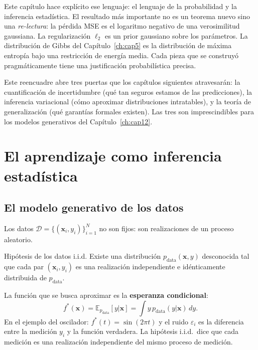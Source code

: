 Este capítulo hace explícito ese lenguaje: el lenguaje de la probabilidad
y la inferencia estadística. El resultado más importante no es un teorema
nuevo sino una \emph{re-lectura}: la pérdida MSE es el logaritmo negativo
de una verosimilitud gaussiana. La regularización $\ell_2$ es un prior
gaussiano sobre los parámetros. La distribución de Gibbs del
Capítulo~\ref{ch:cap5} es la distribución de máxima entropía bajo una
restricción de energía media. Cada pieza que se construyó pragmáticamente
tiene una justificación probabilística precisa.

Este reencuadre abre tres puertas que los capítulos siguientes atravesarán:
la cuantificación de incertidumbre (qué tan seguros estamos de las
predicciones), la inferencia variacional (cómo aproximar distribuciones
intratables), y la teoría de generalización (qué garantías formales
existen). Las tres son imprescindibles para los modelos generativos del
Capítulo~\ref{ch:cap12}.

\section{El aprendizaje como inferencia estadística}
\label{sec:aprendizaje_inferencia}


\subsection{El modelo generativo de los datos}
\label{subsec:modelo_generativo}

Los datos $\mathcal{D} = \{(\bm{x}_i, y_i)\}_{i=1}^N$ no son fijos:
son realizaciones de un proceso aleatorio.

\begin{definicion}{Hipótesis de los datos i.i.d.}
\label{hip:iid}
Existe una distribución $p_{\text{data}}(\bm{x},y)$ desconocida tal que
cada par $(\bm{x}_i, y_i)$ es una realización independiente e
idénticamente distribuida de $p_{\text{data}}$.
\end{definicion}

La función que se busca aproximar es la \textbf{esperanza condicional}:
\begin{equation}
  f^*(\bm{x}) = \mathbb{E}_{p_{\text{data}}}[y|\bm{x}]
  = \int y\,p_{\text{data}}(y|\bm{x})\,dy.
  \label{eq:esperanza_cond}
\end{equation}
En el ejemplo del oscilador: $f^*(t) = \sin(2\pi t)$ y el ruido
$\varepsilon_i$ es la diferencia entre la medición $y_i$ y la función
verdadera. La hipótesis i.i.d.\ dice que cada medición es una
realización independiente del mismo proceso de medición.

